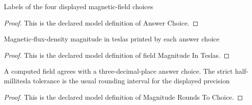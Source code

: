 \begin{definition}
  \label{def:physics:phyx-mini-0948:phyxminiproblems-problemphyxmini0948-answerchoice}
  Labels of the four displayed magnetic-field choices
\end{definition}
\begin{proof}
  This is the declared model definition of Answer Choice.
\end{proof}
\begin{definition}
  \label{def:physics:phyx-mini-0948:phyxminiproblems-problemphyxmini0948-answerchoice-fieldmagnitudeinteslas}
  Magnetic-flux-density magnitude in teslas printed by each answer choice
\end{definition}
\begin{proof}
  This is the declared model definition of field Magnitude In Teslas.
\end{proof}
\begin{definition}
  \label{def:physics:phyx-mini-0948:phyxminiproblems-problemphyxmini0948-magnituderoundstochoice}
  A computed field agrees with a three-decimal-place answer choice. The strict half-millitesla tolerance is the usual rounding interval for the displayed precision
\end{definition}
\begin{proof}
  This is the declared model definition of Magnitude Rounds To Choice.
\end{proof}
